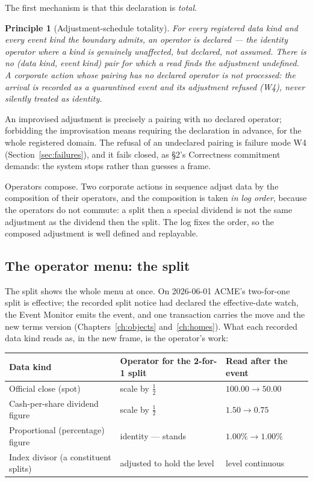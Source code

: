 \documentclass[11pt,a4paper]{article}
\newtheorem{principle}[definition]{Principle}
\begin{document}
The first mechanism is that this declaration is \emph{total}.

\begin{principle}[Adjustment-schedule totality]\label{prin:sched-total}
For every registered data kind and every event kind the boundary admits, an operator is
declared --- the identity operator where a kind is genuinely unaffected, but declared, not
assumed. There is no (data kind, event kind) pair for which a read finds the adjustment
undefined. A corporate action whose pairing has no declared operator is not processed: the
arrival is recorded as a quarantined event and its adjustment refused (W4), never silently
treated as identity.
\end{principle}

An
improvised adjustment is precisely a pairing with no declared operator; forbidding the
improvisation means requiring the declaration in advance, for the whole registered domain.
The refusal of an undeclared pairing is failure mode W4 (Section~\ref{sec:failures}), and
it fails closed, as \S 2's Correctness commitment demands: the system stops rather than
guesses a frame.

Operators compose. Two corporate actions in sequence adjust data by the composition of
their operators, and the composition is taken \emph{in log order}, because the operators do
not commute: a split then a special dividend is not the same adjustment as the dividend
then the split. The log fixes the order, so the composed adjustment is well defined and
replayable.


\subsection{The operator menu: the split}\label{sec:menu}

The split shows the whole menu at once. On 2026-06-01 ACME's two-for-one split is
effective; the recorded split notice had declared the effective-date watch, the Event
Monitor emits the event, and one transaction carries the move and the new terms version
(Chapters~\ref{ch:objects} and~\ref{ch:homes}). What each recorded data kind reads as, in
the new frame, is the operator's work:

\begin{center}
\begin{tabular}{@{}lll@{}}
\toprule
Data kind & Operator for the 2-for-1 split & Read after the event \\
\midrule
Official close (spot) & scale by $\tfrac12$ & $100.00 \rightarrow 50.00$ \\
Cash-per-share dividend figure & scale by $\tfrac12$ & $1.50 \rightarrow 0.75$ \\
Proportional (percentage) figure & identity --- stands & $1.00\% \rightarrow 1.00\%$ \\
Index divisor (a constituent splits) & adjusted to hold the level & level continuous \\
\bottomrule
\end{tabular}
\end{center}
\end{document}
